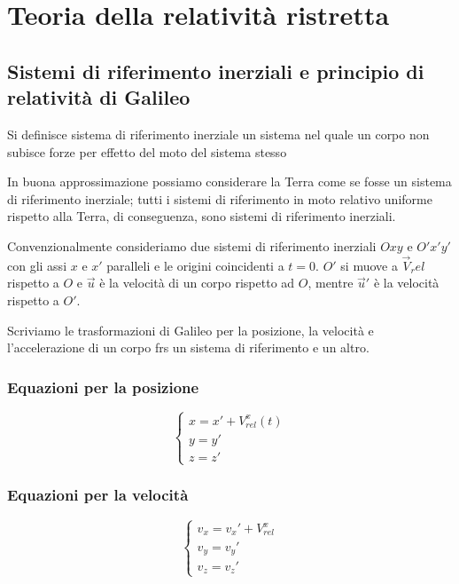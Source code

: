 \section{Teoria della relatività ristretta}
    \subsection{Sistemi di riferimento inerziali e principio di relatività di Galileo}
    \par Si definisce sistema di riferimento inerziale un sistema nel quale un corpo non subisce forze per effetto del moto del sistema stesso
    \par In buona approssimazione possiamo considerare la Terra come se fosse un sistema di riferimento inerziale; tutti i sistemi di riferimento in moto relativo uniforme rispetto alla Terra, di conseguenza, sono sistemi di riferimento inerziali.
    \par Convenzionalmente consideriamo due sistemi di riferimento inerziali $Oxy$ e $O'x'y'$ con gli assi $x$ e $x'$ paralleli e le origini coincidenti a $t=0$. $O'$ si muove a $\vec{V}_rel$ rispetto a $O$ e $\vec{u}$ è la velocità di un corpo rispetto ad $O$, mentre $\vec{u}'$ è la velocità rispetto a $O'$.
    \par Scriviamo le trasformazioni di Galileo per la posizione, la velocità e l'accelerazione di un corpo frs un sistema di riferimento e un altro.
    \subsubsection{Equazioni per la posizione}
    \begin{equation}
        \begin{cases}
        x = x' + V_{rel}^x(t)\\
        y = y'\\
        z = z'
        \end{cases}
    \end{equation}
    \subsubsection{Equazioni per la velocità}
    \begin{equation}
        \begin{cases}
        v_x = v_x' + V_{rel}^x\\
        v_y = v_y'\\
        v_z = v_z'
        \end{cases}
    \end{equation}
